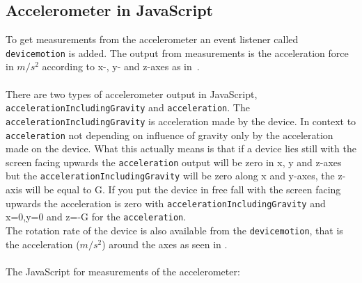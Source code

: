 \subsection{Accelerometer in JavaScript}\label{subsec:accJS}
To get measurements from the accelerometer an event listener called \texttt{devicemotion} is added. The output from measurements is the acceleration force in $m/s^2$ according to x-, y- and z-axes as in~. \\
\\
There are two types of accelerometer output in JavaScript, \texttt{accelerationIncludingGravity} and \texttt{acceleration}. The \texttt{accelerationIncludingGravity} is acceleration made by the device. In context to \texttt{acceleration} not depending on influence of gravity only by the acceleration made on the device. What this actually means is that if a device lies still with the screen facing upwards the \texttt{acceleration} output will be zero in x, y and z-axes but the \texttt{accelerationIncludingGravity} will be zero along x and y-axes, the z-axis will be equal to G. If you put the device in free fall with the screen facing upwards the acceleration is zero with \texttt{accelerationIncludingGravity} and x=0,y=0 and z=-G for the \texttt{acceleration}. \cite[]{sensor:W3Cspec} \\
The rotation rate of the device is also available from the \texttt{devicemotion}, that is the acceleration ($m/s^2$) around the axes as seen in . \\
\\
The JavaScript for measurements of the accelerometer:

\cite[]{sensor:W3C}


